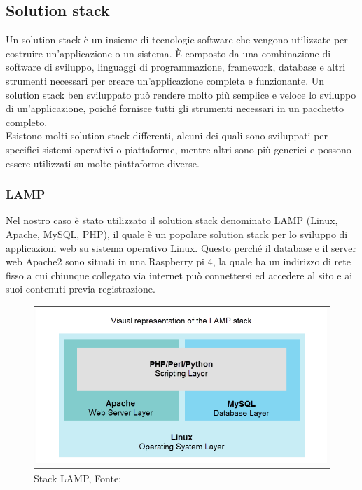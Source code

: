\documentclass[a4paper,final,12pt]{report}
\begin{document}
\subsection{Solution stack}
Un solution stack è un insieme di tecnologie software che vengono utilizzate per costruire un'applicazione o un sistema. È composto da una combinazione di software di sviluppo, linguaggi di programmazione, framework, database e altri strumenti necessari per creare un'applicazione completa e funzionante.
Un solution stack ben sviluppato può rendere molto più semplice e veloce lo sviluppo di un'applicazione, poiché fornisce tutti gli strumenti necessari in un pacchetto completo.\\ 
Esistono molti solution stack differenti, alcuni dei quali sono sviluppati per specifici sistemi operativi o piattaforme, mentre altri sono più generici e possono essere utilizzati su molte piattaforme diverse.\\

\subsubsection{LAMP}
Nel nostro caso è stato utilizzato il solution stack denominato LAMP (Linux, Apache, MySQL, PHP), il quale è un popolare solution stack per lo sviluppo di applicazioni web su sistema operativo Linux. Questo perché il database e il server web Apache2 sono situati in una Raspberry pi 4, la quale ha un indirizzo di rete fisso a cui chiunque collegato via internet può connettersi ed accedere al sito e ai suoi contenuti previa registrazione.
\begin{figure}[hbtp]
\centering
\includegraphics[scale=0.47]{img_concettuale/LAMP.png}
\caption{Stack LAMP, Fonte: \cite{phoenixnap}}

\end{figure} 
\end{document}
